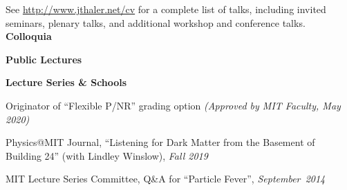 \bbl

\el





\vspace{-.1in}
 




See \url{http://www.jthaler.net/cv} for a complete list of talks, including invited seminars, plenary talks, and additional workshop and conference talks.\\

\noindent \textbf{Colloquia}




\noindent \textbf{Public Lectures}




\noindent \textbf{Lecture Series \& Schools}



  





\bbl
\item Originator of ``Flexible P/NR'' grading option \textit{(Approved by MIT Faculty, May 2020)}

\item Physics@MIT Journal, ``Listening for Dark Matter from the Basement of Building 24'' (with Lindley Winslow), \textit{Fall 2019}
\item MIT Lecture Series Committee, Q\&A for ``Particle Fever'', \textit{September~2014}
\el

  